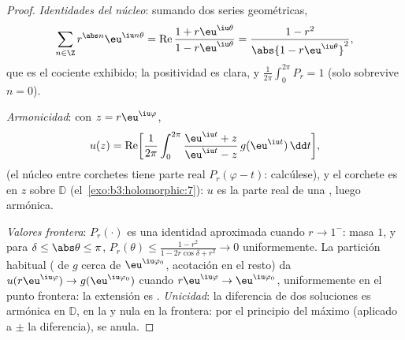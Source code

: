 \begin{proof}
\emph{Identidades del núcleo}: sumando dos series geométricas,
\[
\sum_{n\in\Z}r^{\abs n}\eu^{\iu n\theta}
= \operatorname{Re}\frac{1 + r\eu^{\iu\theta}}{1 -
r\eu^{\iu\theta}}
= \frac{1 - r^2}{\abs{1 - r\eu^{\iu\theta}}^2},
\]
que es el cociente exhibido; la positividad es clara, y
$\frac1{2\pi}\int_0^{2\pi}P_r = 1$ (solo sobrevive $n = 0$).

\emph{Armonicidad}: con $z = r\eu^{\iu\varphi}$,
\[
u(z) = \operatorname{Re}\biggl[\frac1{2\pi}\int_0^{2\pi}
\frac{\eu^{\iu t} + z}{\eu^{\iu t} - z}\,
g(\eu^{\iu t})\,\dd t\biggr],
\]
(el núcleo entre corchetes tiene parte real $P_r(\varphi - t)$:
calcúlese), y el corchete es 
en $z$ sobre $\mathbb D$ (el~\cref{exo:b3:holomorphic:7}): $u$ es la
parte real de una ,
luego armónica.

\emph{Valores frontera}: $P_r(\cdot)$ es una identidad aproximada cuando
$r \to 1^-$: masa $1$, y para $\delta \leq
\abs\theta \leq \pi$, $P_r(\theta) \leq \frac{1 - r^2}{1 -
2r\cos\delta + r^2} \to 0$ uniformemente. La partición habitual
( de $g$ cerca de
$\eu^{\iu\varphi_0}$, acotación en el resto) da
$u(r\eu^{\iu\varphi}) \to
g(\eu^{\iu\varphi_0})$ cuando $r\eu^{\iu\varphi} \to
\eu^{\iu\varphi_0}$, uniformemente en el punto frontera: la extensión es
. \emph{Unicidad}: la
diferencia de dos soluciones es armónica en $\mathbb D$,
 en la
 y nula en la frontera: por
el principio del máximo (aplicado a $\pm$ la diferencia), se anula.
\end{proof}

